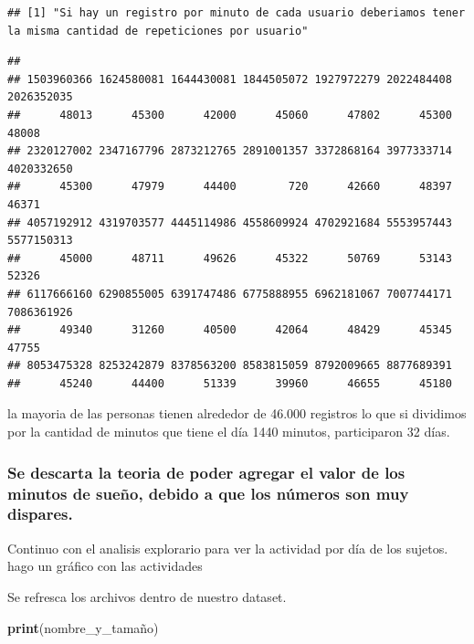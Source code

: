 \documentclass[
]{article}
\newenvironment{Shaded}{\begin{snugshade}}{\end{snugshade}}
\newcommand{\FunctionTok}[1]{\textcolor[rgb]{0.13,0.29,0.53}{\textbf{#1}}}
\newcommand{\NormalTok}[1]{#1}
\newcommand{\SpecialCharTok}[1]{\textcolor[rgb]{0.81,0.36,0.00}{\textbf{#1}}}
\begin{document}
\begin{verbatim}
## [1] "Si hay un registro por minuto de cada usuario deberiamos tener la misma cantidad de repeticiones por usuario"
\end{verbatim}

\begin{Shaded}
\end{Shaded}

\begin{verbatim}
## 
## 1503960366 1624580081 1644430081 1844505072 1927972279 2022484408 2026352035 
##      48013      45300      42000      45060      47802      45300      48008 
## 2320127002 2347167796 2873212765 2891001357 3372868164 3977333714 4020332650 
##      45300      47979      44400        720      42660      48397      46371 
## 4057192912 4319703577 4445114986 4558609924 4702921684 5553957443 5577150313 
##      45000      48711      49626      45322      50769      53143      52326 
## 6117666160 6290855005 6391747486 6775888955 6962181067 7007744171 7086361926 
##      49340      31260      40500      42064      48429      45345      47755 
## 8053475328 8253242879 8378563200 8583815059 8792009665 8877689391 
##      45240      44400      51339      39960      46655      45180
\end{verbatim}

la mayoria de las personas tienen alrededor de 46.000 registros lo que
si dividimos por la cantidad de minutos que tiene el día 1440 minutos,
participaron 32 días.

\subsubsection{Se descarta la teoria de poder agregar el valor de los
minutos de sueño, debido a que los números son muy
dispares.}\label{se-descarta-la-teoria-de-poder-agregar-el-valor-de-los-minutos-de-sueuxf1o-debido-a-que-los-nuxfameros-son-muy-dispares.}

Continuo con el analisis explorario para ver la actividad por día de los
sujetos. hago un gráfico con las actividades

Se refresca los archivos dentro de nuestro dataset.

\begin{Shaded}
\begin{Highlighting}[]
\FunctionTok{print}\NormalTok{(nombre\_y\_tamaño)}
\end{Highlighting}
\end{Shaded}
\end{document}
